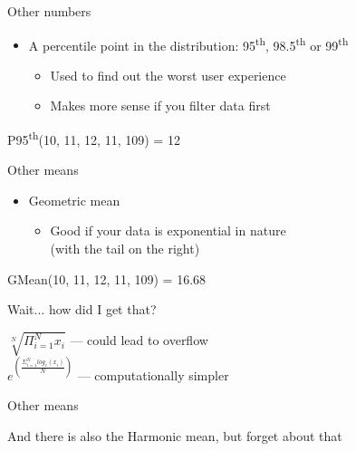 \documentclass{beamer}
\begin{document}
\begin{frame}{Other numbers}
  \begin{itemize}
  \item A percentile point in the distribution: 95\textsuperscript{th}, 98.5\textsuperscript{th} or 99\textsuperscript{th}
    \begin{itemize}
    \item Used to find out the worst user experience
    \item Makes more sense if you filter data first
    \end{itemize}
  \end{itemize}
  \begin{center}
  \Large{ P95\textsuperscript{th}(10, 11, 12, 11, 109) = 12 }
  \end{center}
\end{frame}

\begin{frame}{Other means}
  \begin{itemize}
  \item Geometric mean
    \begin{itemize}
    \item Good if your data is exponential in nature \\ (with the tail on the right)
    \end{itemize}
  \end{itemize}
  \begin{center}
  \Large{ GMean(10, 11, 12, 11, 109) = 16.68 }
  \end{center}
\end{frame}

\begin{frame}{Wait... how did I get that?}
  \pause

  \begin{center}
  \Large{\( \sqrt[N]{\Pi^N_{i=1}x_i} \)}
  \pause
  --- could lead to overflow \\
  \medskip
  \pause
  \medskip
  \Large{ \( e^{ \left(\frac{\Sigma^N_{i=1} log_e(x_i)}{N}\right) } \)} 
  --- computationally simpler
  \end{center}
\end{frame}

\begin{frame}{Other means}
  \begin{center}
  And there is also the Harmonic mean, but forget about that
  \end{center}
\end{frame}
\end{document}
